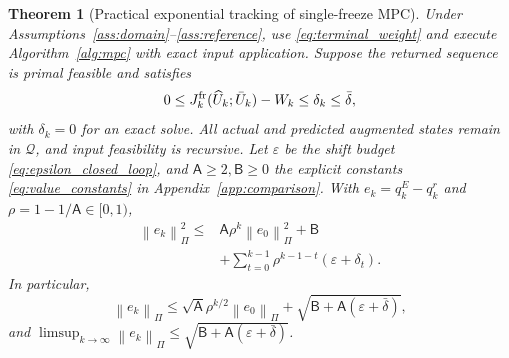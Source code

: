 \documentclass[journal]{IEEEtran}
\newtheorem{theorem}{Theorem}
\newcommand{\norm}[1]{\left\lVert #1\right\rVert}
\begin{document}
\begin{theorem}[Practical exponential tracking of single-freeze MPC]
\label{thm:tracking}
Under Assumptions~\ref{ass:domain}--\ref{ass:reference}, use \eqref{eq:terminal_weight} and execute Algorithm~\ref{alg:mpc} with exact input application. Suppose the returned sequence is primal feasible and satisfies
\begin{equation}
0\le J_k^{\rm fr}(\widehat U_k;\bar U_k)-W_k
\le\delta_k\le\bar\delta,
\label{eq:solver_gap}
\end{equation}
with $\delta_k=0$ for an exact solve. All actual and predicted augmented states remain in $\mathcal Q$, and input feasibility is recursive. Let $\varepsilon$ be the shift budget \eqref{eq:epsilon_closed_loop}, and $\mathsf A\ge2,\mathsf B\ge0$ the explicit constants \eqref{eq:value_constants} in Appendix~\ref{app:comparison}. With $e_k=q_k^E-q_k^r$ and $\rho=1-1/\mathsf A\in[0,1)$,
\begin{equation}
\begin{split}
\norm{e_k}_\Pi^2\le{}&\mathsf A\rho^k\norm{e_0}_\Pi^2+\mathsf B\\
&+\sum_{t=0}^{k-1}\rho^{k-1-t}(\varepsilon+\delta_t).
\end{split}
\label{eq:squared_tracking_bound}
\end{equation}
In particular,
\begin{equation}
\norm{e_k}_\Pi\le\sqrt{\mathsf A}\rho^{k/2}\norm{e_0}_\Pi
+\sqrt{\mathsf B+\mathsf A(\varepsilon+\bar\delta)},
\label{eq:practical_tracking}
\end{equation}
and $\limsup_{k\to\infty}\norm{e_k}_\Pi\le
\sqrt{\mathsf B+\mathsf A(\varepsilon+\bar\delta)}$.
\end{theorem}
\end{document}
